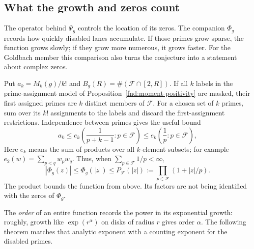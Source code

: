 \subsection{What the growth and zeros count}
\label{grw:section}

The operator behind $\Psi_g$ controls the location of its zeros.
The companion $\Phi_g$ records how quickly disabled lanes accumulate.
If those primes grow sparse, the function grows slowly; if they grow
more numerous, it grows faster.  For the Goldbach member this comparison
also turns the conjecture into a statement about complex zeros.

Put $a_k=M_k(g)/k!$ and $B_g(R)=\#(\mathcal F\cap[2,R])$.
If all $k$ labels in the prime-assignment model of
Proposition~\ref{fnd:moment-positivity} are masked, their first
assigned primes are $k$ distinct members of $\mathcal F$.
For a chosen set of $k$ primes, sum over its $k!$ assignments to the
labels and discard the first-assignment restrictions.  Independence
between primes gives the useful bound
\begin{equation}
 a_k\le e_k\left(\frac1{p+k-1}:p\in\mathcal F\right)
 \le e_k\left(\frac1p:p\in\mathcal F\right),
 \label{grw:coefficient-majorant}
\end{equation}
Here $e_k$ means the sum of products over all $k$-element subsets; for
example $e_2(w)=\sum_{p<q}w_pw_q$.  Thus, when
$\sum_{p\in\mathcal F}1/p<\infty$,
\begin{equation}
 |\Phi_g(z)|\le\Phi_g(|z|)
 \le P_{\mathcal F}(|z|):=
       \prod_{p\in\mathcal F}(1+|z|/p).
 \label{grw:majorant}
\end{equation}
The product bounds the function from above.  Its factors are not being
identified with the zeros of $\Phi_g$.

The \emph{order} of an entire function records the power in its
exponential growth: roughly, growth like $\exp(r^\alpha)$ on disks of
radius $r$ gives order $\alpha$.  The following theorem matches that
analytic exponent with a counting exponent for the disabled primes.

